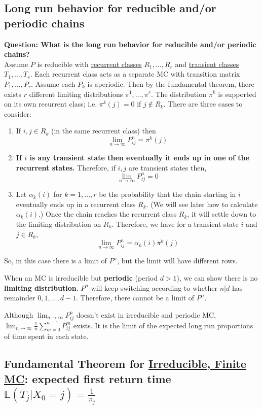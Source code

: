 \documentclass[11pt]{elegantbook}
\begin{document}
\subsection{Long run behavior for reducible and/or periodic chains}
\textbf{Question: What is the long run behavior for reducible and/or periodic chains?}\\
Assume $P$ is reducible with \underline{recurrent classes} $R_1, \ldots, R_r$ and \underline{transient classes} $T_1, \ldots, T_s$. Each recurrent class acts as a separate $\mathrm{MC}$ with transition matrix $P_1, \ldots, P_r$. Assume each $P_k$ is aperiodic. Then by the fundamental theorem, there exists $r$ different limiting distributions $\pi^1, \ldots, \pi^r$. The distribution $\pi^k$ is supported on its own recurrent class; i.e. $\pi^k(j)=0$ if $j \notin R_k .$ There are three cases to consider:
\begin{enumerate}
    \item If $i,j\in R_k$ (in the same recurrent class) then $$\lim_{n \rightarrow \infty}P_{ij}^n=\pi^k(j)$$
    \item \textbf{If $i$ is any transient state then eventually it ends up in one of the recurrent states.} Therefore, if $i,j$ are transient states then, $$\lim_{n \rightarrow \infty}P_{ij}^n=0$$
    \item Let $\alpha_k(i)$ for $k = 1,...,r$ be the probability that the chain starting in $i$ eventually ends up in a recurrent class $R_k$. (We will see later how to calculate $\alpha_k(i)$.) Once the chain reaches the recurrent class $R_k$, it will settle down to the limiting distribution on $R_k$. Therefore, we have for a transient state $i$ and $j \in R_k$, $$\lim_{n \rightarrow \infty}P_{ij}^n=\alpha_k(i)\pi^k(j)$$
\end{enumerate}
So, in this case there is a limit of $P^n$, but the limit will have different rows.

When an MC is irreducible but \textbf{periodic} (period $d>1$), we can show there is no \textbf{limiting distribution}. $P^n$ will keep switching according to whether $n|d$ has remainder $0,1,...,d-1$. Therefore, there cannot be a limit of $P^n$.

Although $\lim_{n \rightarrow \infty}P_{ij}^n$ doesn't exist in irreducible and periodic MC, $\lim_{n \rightarrow \infty}\frac{1}{n}\sum_{m=0}^{n-1}P_{ij}^m$ exists. It is the limit of the expected long run proportions of time spent in each state.

\subsection{Fundamental Theorem for \underline{Irreducible, Finite MC}: expected first return time $\mathbb{E}(T_j|X_0 = j)=\frac{1}{\pi_j}$}
\end{document}
